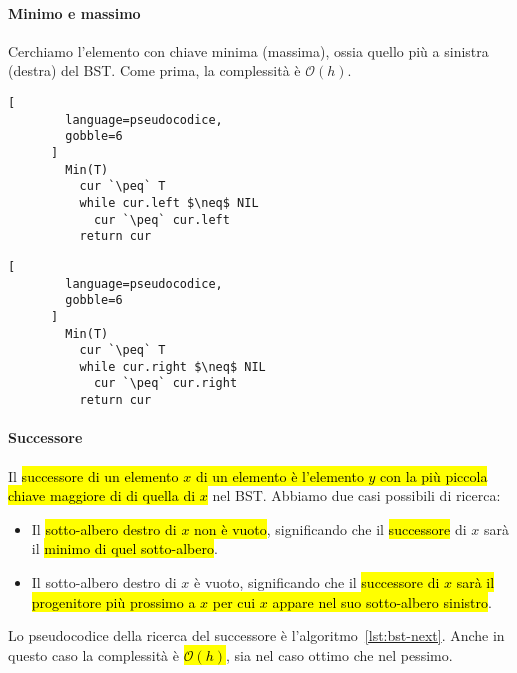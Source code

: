 \documentclass[a4paper,11pt,twoside]{article}
\theoremstyle{plain}
\theoremstyle{definition}
\theoremstyle{remark}
\newcommand{\peq}{$\gets$}
\begin{document}
\paragraph{Minimo e massimo} Cerchiamo l'elemento con chiave minima (massima),
ossia quello più a sinistra (destra) del BST. Come prima, la complessità è
$\mathcal{O}(h)$.

\noindent\begin{minipage}{\linewidth}
  \centering
  \begin{minipage}{0.45\linewidth}
    \centering
    \begin{lstlisting}[
        language=pseudocodice,
        gobble=6
      ]
        Min(T)
          cur `\peq` T
          while cur.left $\neq$ NIL
            cur `\peq` cur.left
          return cur
    \end{lstlisting}
  \end{minipage}
  \begin{minipage}{0.45\linewidth}
    \centering
    \begin{lstlisting}[
        language=pseudocodice,
        gobble=6
      ]
        Min(T)
          cur `\peq` T
          while cur.right $\neq$ NIL
            cur `\peq` cur.right
          return cur
    \end{lstlisting}
  \end{minipage}
\end{minipage}

\paragraph{Successore} Il \hl{successore di un elemento $x$ di un elemento è
l'elemento $y$ con la più piccola chiave maggiore di di quella di $x$} nel BST.
Abbiamo due casi possibili di ricerca:

\begin{itemize}
  \item Il \hl{sotto-albero destro di $x$ non è vuoto}, significando che il
    \hl{successore} di $x$ sarà il \hl{minimo di quel sotto-albero}.
  \item Il sotto-albero destro di $x$ è vuoto, significando che il
    \hl{successore di $x$ sarà il progenitore più prossimo a $x$ per cui $x$
    appare nel suo sotto-albero sinistro}.
\end{itemize}

\noindent Lo pseudocodice della ricerca del successore è
l'algoritmo~\ref{lst:bst-next}. Anche in questo caso la complessità è
\hl{$\mathcal{O}(h)$}, sia nel caso ottimo che nel pessimo.
\end{document}
